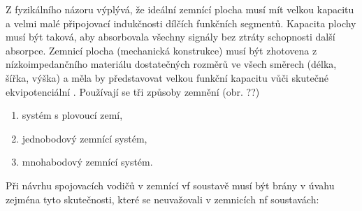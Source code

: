       Z fyzikálního názoru výplývá, že ideální zemnící plocha musí mít velkou kapacitu a velmi malé
      připojovací indukčnosti dílčích funkčních segmentů. Kapacita plochy musí být taková, aby
      absorbovala všechny signály bez ztráty schopnosti další absorpce. Zemnicí plocha (mechanická
      konstrukce) musí být zhotovena z nízkoimpedančního materiálu dostatečných rozměrů ve všech
      směrech (délka, šířka, výška) a měla by představovat velkou funkční kapacitu vůči skutečné
      ekvipotenciální . Používají se tři způsoby zemnění (obr. ??)
      \begin{enumerate}[noitemsep]
        \item systém s plovoucí zemí,
        \item jednobodový zemnící systém,
        \item mnohabodový zemnící systém.      
      \end{enumerate}
      Při návrhu spojovacích vodičů v zemnící vf soustavě musí být brány v úvahu zejména tyto
      skutečnosti, které se neuvažovali v zemnicích nf soustavách:
